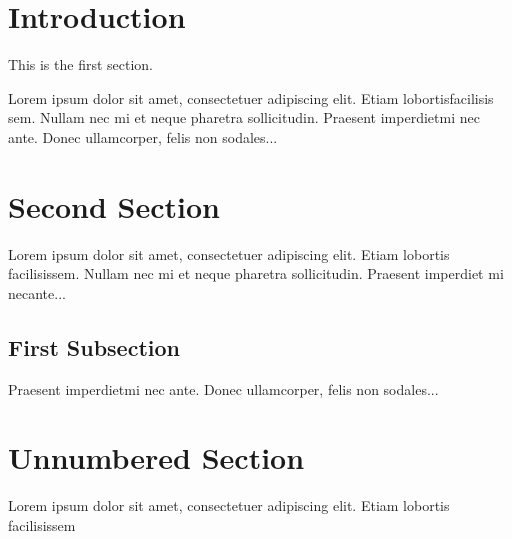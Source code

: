 \documentclass[12pt, a4paper]{article}
\begin{document}
\section{Introduction}

This is the first section.

Lorem  ipsum  dolor  sit  amet,  consectetuer  adipiscing
elit.   Etiam  lobortisfacilisis sem.  Nullam nec mi et
neque pharetra sollicitudin.  Praesent imperdietmi nec ante.
Donec ullamcorper, felis non sodales...
\section{Second Section}

Lorem ipsum dolor sit amet, consectetuer adipiscing elit.
Etiam lobortis facilisissem.  Nullam nec mi et neque pharetra
sollicitudin.  Praesent imperdiet mi necante...

\subsection{First Subsection}
Praesent imperdietmi nec ante. Donec ullamcorper, felis non sodales...

\section*{Unnumbered Section}
Lorem ipsum dolor sit amet, consectetuer adipiscing elit.
Etiam lobortis facilisissem
\end{document}
